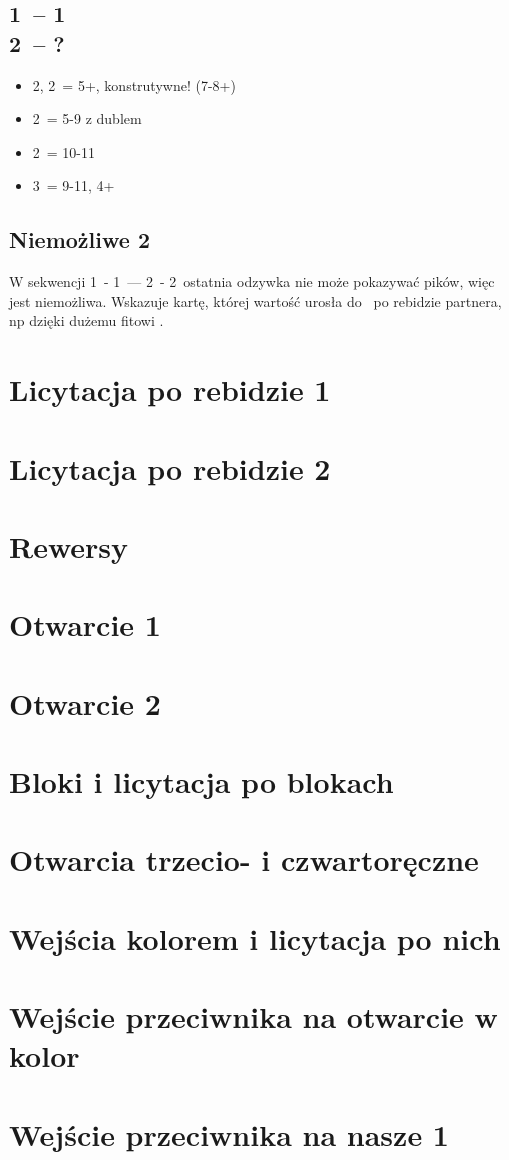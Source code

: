 \documentclass[12pt, a4paper]{article}
\begin{document}
\subsection*{1\spades\ -- 1\ntx\ \\ 2\clubs\ -- ?}
\begin{itemize}
    \item 2\diams, 2\hearts\ = 5+\diams\hearts, konstrutywne! (7-8+)
    \item 2\spades\ = 5-9 z dublem \spades
    \item 2\nt\ = 10-11
    \item 3\clubs\ = 9-11, 4+\clubs
\end{itemize}

\subsection*{Niemożliwe 2\spades}
\begin{formal}
    W sekwencji 1\hearts\ - 1\nt\ --- 2\minor\ - 2\spades\ ostatnia odzywka nie może pokazywać pików,
    więc jest niemożliwa. Wskazuje kartę, której wartość urosła do \gf\ po rebidzie partnera,
    np dzięki dużemu fitowi \minor.  
\end{formal}


\pagebreak
\section{Licytacja po rebidzie 1\ntx}

\section{Licytacja po rebidzie 2\ntx}

\section{Rewersy}

\section{Otwarcie 1\ntx}

\section{Otwarcie 2\ntx}

\section{Bloki i licytacja po blokach}

\section{Otwarcia trzecio- i czwartoręczne}

\section{Wejścia kolorem i licytacja po nich}

\section{Wejście przeciwnika na otwarcie w kolor}

\section{Wejście przeciwnika na nasze 1\ntx}
\end{document}
